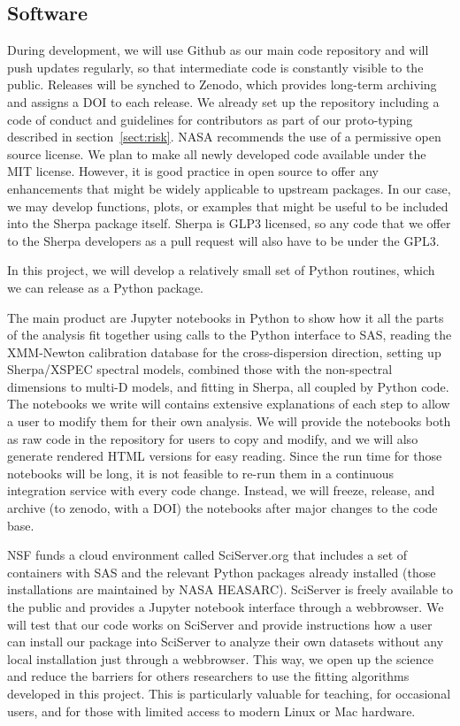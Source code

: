 \documentclass[fleqn,12pt,onecolumn]{SelfArx} %
\begin{document}
\subsection{Software}
During development, we will use Github as our main code repository and will push updates regularly, so that intermediate code is constantly visible to the public. Releases will be synched to Zenodo, which provides long-term archiving and assigns a DOI to each release. We already set up the repository including a code of conduct and guidelines for contributors as part of our proto-typing described in section~\ref{sect:risk}. NASA recommends the use of a permissive open source license. We plan to make all newly developed code available under the MIT license. However, it is good practice in open source to offer any enhancements that might be widely applicable to upstream packages. In our case, we may develop functions, plots, or examples that might be useful to be included into the Sherpa package itself. Sherpa is GLP3 licensed, so any code that we offer to the Sherpa developers as a pull request will also have to be under the GPL3.

In this project, we will develop a relatively small set of Python routines, which we can release as a Python package.

The main product are Jupyter notebooks in Python to show how it all the parts of the analysis fit together using calls to the Python interface to SAS, reading the XMM-Newton calibration database for the cross-dispersion direction, setting up Sherpa/XSPEC spectral models, combined those with the non-spectral dimensions to multi-D models, and fitting in Sherpa, all coupled by Python code. The notebooks we write will contains extensive explanations of each step to allow a user to modify them for their own analysis. We will provide the notebooks both as raw code in the repository for users to copy and modify, and we will also generate rendered HTML versions for easy reading. Since the run time for those notebooks will be long, it is not feasible to re-run them in a continuous integration service with every code change. Instead, we will freeze, release, and archive (to zenodo, with a DOI) the notebooks after major changes to the code base.

NSF funds a cloud environment called SciServer.org \cite{2020A&C....3300412T} that includes a set of containers with SAS and the relevant Python packages already installed (those installations are maintained by NASA HEASARC). SciServer is freely available to the public and provides a Jupyter notebook interface through a webbrowser. We will test that our code works on SciServer and provide instructions how a user can install our package into SciServer to analyze their own datasets without any local installation just through a webbrowser. This way, we open up the science and reduce the barriers for others researchers to use the fitting algorithms developed in this project. This is particularly valuable for teaching, for occasional users, and for those with limited access to modern Linux or Mac hardware.
\end{document}
